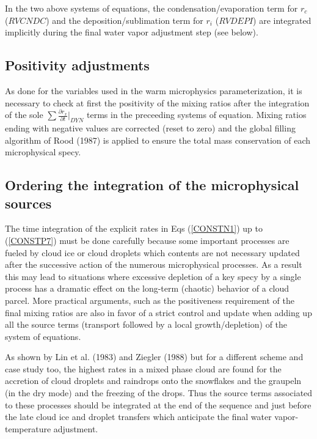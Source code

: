 In the two above systems of equations, the condensation/evaporation term for
$r_c$ ($RVCNDC$) and the deposition/sublimation term for $r_i$ ($RVDEPI$) are
integrated implicitly during the final water vapor adjustment step (see below).

%
\subsection{Positivity adjustments}
%

As done for the variables used in the warm microphysics parameterization, it is
necessary to check at first the positivity of the
mixing ratios after the integration of the sole
$\sum \frac{\displaystyle{\partial r_x}}{\displaystyle{\partial t}} \Big|_{DYN}$
terms in the preceeding systems of equation. Mixing ratios ending with negative
values are corrected (reset to zero) and the global filling algorithm of Rood
(1987) is applied to ensure the total mass conservation of each microphysical
specy.

%
\subsection{Ordering the integration of the microphysical sources}
%
The time integration of the explicit rates in Eqs (\ref{CONSTN1}) up to
(\ref{CONSTP7}) must be done carefully
because some important processes are fueled by cloud ice or cloud droplets which
contents are not necessary updated after the successive action of the numerous
microphysical processes. As a result this may lead to situations where excessive
depletion of a key specy by a single process has a dramatic effect on the
long-term (chaotic) behavior of a cloud parcel. More practical arguments, such
as the positiveness requirement of the final mixing ratios are also in favor of
a strict control and update when adding up all the source terms (transport
followed by a local growth/depletion) of the system of equations.

As shown by Lin et al. (1983) and Ziegler (1988) but for a different scheme and
case study too, the highest rates in a mixed phase cloud are found for the
accretion of cloud droplets and raindrops onto the snowflakes and the graupeln
(in the dry mode)
and the freezing of the drops. Thus the source terms associated to these
processes should be integrated at the end of the sequence and just before the
late cloud ice and droplet transfers which anticipate the final water
vapor-temperature adjustment.

